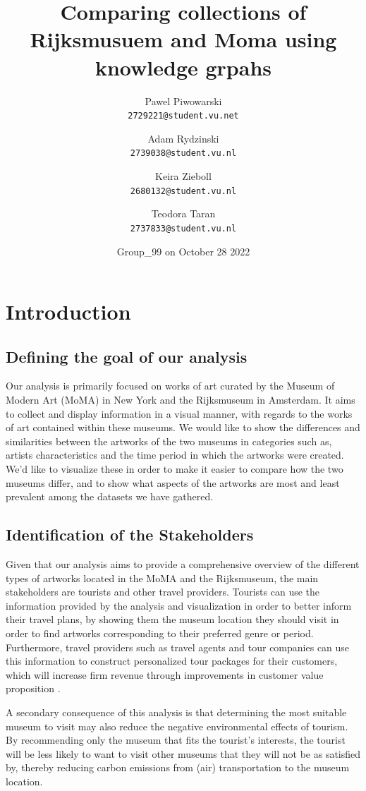 \documentclass{article}
\title{Comparing collections of Rijksmusuem and Moma using knowledge grpahs}
\author{
  Pawel Piwowarski\\
  \texttt{2729221@student.vu.net}
  \and
  Adam Rydzinski\\
  \texttt{2739038@student.vu.nl}
  \and
  Keira Zieboll\\
  \texttt{2680132@student.vu.nl}
   \and
  Teodora Taran\\
  \texttt{2737833@student.vu.nl}
}
\date{Group\_99 on October 28 2022}
\begin{document}
\maketitle


\section{Introduction}
\subsection{Defining the goal of our analysis}

Our analysis is primarily focused on works of art curated by the Museum of Modern Art (MoMA) in New York and the Rijksmuseum in Amsterdam. It aims to collect and display information in a visual manner, with regards to the works of art contained within these museums. We would like to show the differences and similarities between the artworks of the two museums in categories such as, artists characteristics and the time period in which the artworks were created. We’d like to visualize these in order to make it easier to compare how the two museums differ, and to show what aspects of the artworks are most and least prevalent among the datasets we have gathered.


\subsection{Identification of the Stakeholders}

Given that our analysis aims to provide a comprehensive overview of the different types of artworks located in the MoMA and the Rijksmuseum, the main stakeholders are tourists and other travel providers. Tourists can use the information provided by the analysis and visualization in order to better inform their travel plans, by showing them the museum location they should visit in order to find artworks corresponding to their preferred genre or period. Furthermore, travel providers such as travel agents and tour companies can use this information to construct personalized tour packages for their customers, which will increase firm revenue through improvements in customer value proposition \cite{keira}.

A secondary consequence of this analysis is that determining the most suitable museum to visit may also reduce the negative environmental effects of tourism. By recommending only the museum that fits the tourist’s interests, the tourist will be less likely to want to visit other museums that they will not be as satisfied by, thereby reducing carbon emissions from (air) transportation to the museum location.
\end{document}
